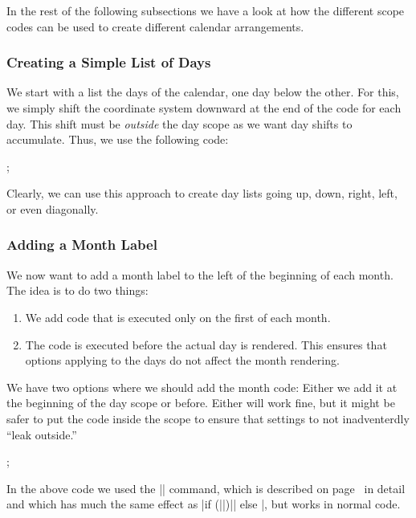 In the rest of the following subsections we have a look at how the
different scope codes can be used to create different calendar
arrangements. 


\subsubsection{Creating a Simple List of Days}

We start with a list the days of the calendar, one day below the
other. For this, we simply shift the coordinate system downward at the
end of the code for each day. This shift must be \emph{outside} the
day scope as we want day shifts to accumulate. Thus, we use the
following code: 
\begin{codeexample}[]
\tikz
  \calendar [dates=2000-01-01 to 2000-01-08,
             execute after day scope=
               {\pgftransformyshift{-1em}}];
\end{codeexample}
Clearly, we can use this approach to create day lists going up,
down, right, left, or even diagonally.


\subsubsection{Adding a Month Label}

We now want to add a month label to the left of the beginning of each
month. The idea is to do two things:
\begin{enumerate}
\item We add code that is executed only on the first of each month.
\item The code is executed before the actual day is rendered. This
  ensures that options applying to the days do not affect the month
  rendering.
\end{enumerate}
We have two options where we should add the month code: Either we add
it at the beginning of the day scope or before. Either will work fine,
but it might be safer to put the code inside the scope to ensure that
settings to not inadventerdly ``leak outside.''
\begin{codeexample}[]
\tikz
  \calendar
    [dates=2000-01-01 to 2000-01-08,
     execute after day scope={\pgftransformyshift{-1em}},
     execute at begin day scope=
       {\ifdate{day of month=1}{\tikzmonthcode}{}},
     set style={{every month}+=[anchor=base east,xshift=-2em]}];
\end{codeexample}

In the above code we used the |\ifdate| command, which is described on
page~\pageref{ifdate} in detail and which has much the same effect as
|if (||)|| else |, but
works in normal code.



